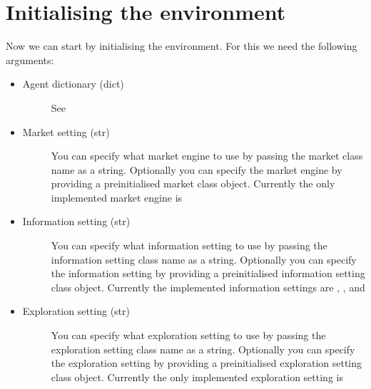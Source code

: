 \documentclass[letterpaper,10pt,english]{sphinxmanual}
\begin{document}
\section{Initialising the environment}
\label{\detokenize{UsingTheEnvironment:initialising-the-environment}}\label{\detokenize{UsingTheEnvironment:env}}
\sphinxAtStartPar
Now we can start by initialising the environment. For this we need the following arguments:
\begin{itemize}
\item {} \begin{description}
\item[{Agent dictionary (dict)}] \leavevmode
\sphinxAtStartPar
See {\hyperref[\detokenize{UsingTheEnvironment:agent-dict}]{}}

\end{description}

\item {} \begin{description}
\item[{Market setting (str)}] \leavevmode
\sphinxAtStartPar
You can specify what market engine to use by passing the market class name as a string. Optionally you can specify
the market engine by providing a pre\sphinxhyphen{}initialised market class object. Currently the only implemented market engine
is 

\end{description}

\item {} \begin{description}
\item[{Information setting (str)}] \leavevmode
\sphinxAtStartPar
You can specify what information setting to use by passing the information setting class name as a string.
Optionally you can specify the information setting by providing a pre\sphinxhyphen{}initialised information setting class object.
Currently the implemented information settings are , ,
 and 

\end{description}

\item {} \begin{description}
\item[{Exploration setting (str)}] \leavevmode
\sphinxAtStartPar
You can specify what exploration setting to use by passing the exploration setting class name as a string.
Optionally you can specify the exploration setting by providing a pre\sphinxhyphen{}initialised exploration setting class object.
Currently the only implemented exploration setting is 


\end{description}
\end{itemize}
\end{document}
